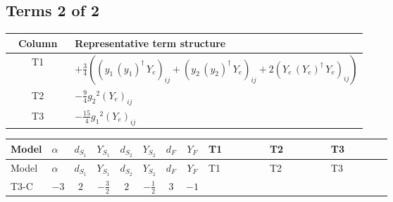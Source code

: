 \documentclass[8pt]{article}
\begin{document}
\begin{landscape}
\subsection*{Terms 2 of 2}
\begin{center}
\begin{tabular}{@{}c >{\raggedright\arraybackslash}p{0.82\linewidth}@{}}
\toprule
Column & Representative term structure \\
\midrule
T1 & \(\displaystyle +\frac{3}{4} (\left({y_1}\,\left({y_1}\right)^{\dagger}\,{Y_e}\right)_{ij}+\left({y_2}\,\left({y_2}\right)^{\dagger}\,{Y_e}\right)_{ij}+2 \left({Y_e}\,\left({Y_e}\right)^{\dagger}\,{Y_e}\right)_{ij})\) \\
\midrule
T2 & \(\displaystyle -\frac{9}{4} {g_2}^2 \left({Y_e}\right)_{ij}\) \\
\midrule
T3 & \(\displaystyle -\frac{15}{4} {g_1}^2 \left({Y_e}\right)_{ij}\) \\
\midrule
\bottomrule
\end{tabular}
\end{center}
\smallskip
\tiny
\begin{longtable}{@{}llcccccc >{\raggedright\arraybackslash}p{0.21\linewidth} >{\raggedright\arraybackslash}p{0.21\linewidth} >{\raggedright\arraybackslash}p{0.21\linewidth}@{}}
\toprule
Model & $\alpha$ & $d_{S_1}$ & $Y_{S_1}$ & $d_{S_2}$ & $Y_{S_2}$ & $d_F$ & $Y_F$ & T1 & T2 & T3 \\
\midrule
\endfirsthead
\toprule
Model & $\alpha$ & $d_{S_1}$ & $Y_{S_1}$ & $d_{S_2}$ & $Y_{S_2}$ & $d_F$ & $Y_F$ & T1 & T2 & T3 \\
\midrule
\endhead
T3-C & $-3$ & $2$ & $-\frac{3}{2}$ & $2$ & $-\frac{1}{2}$ & $3$ & $-1$ & \scriptsize\adjustbox{max width=\linewidth}{$\begin{gathered} +\frac{3}{4} (\left({y_1}\,\left({y_1}\right)^{\dagger}\,{Y_e}\right)_{ij}+\left({y_2}\,\left({y_2}\right)^{\dagger}\,{Y_e}\right)_{ij}+2 \left({Y_e}\,\left({Y_e}\right)^{\dagger}\,{Y_e}\right)_{ij})\end{gathered}$} & \scriptsize\adjustbox{max width=\linewidth}{$\begin{gathered} -\frac{9}{4} {g_2}^2 \left({Y_e}\right)_{ij}\end{gathered}$} & \scriptsize\adjustbox{max width=\linewidth}{$\begin{gathered} -\frac{15}{4} {g_1}^2 \left({Y_e}\right)_{ij}\end{gathered}$} \\
\midrule
\bottomrule
\end{longtable}
\clearpage

\end{landscape}
\end{document}
